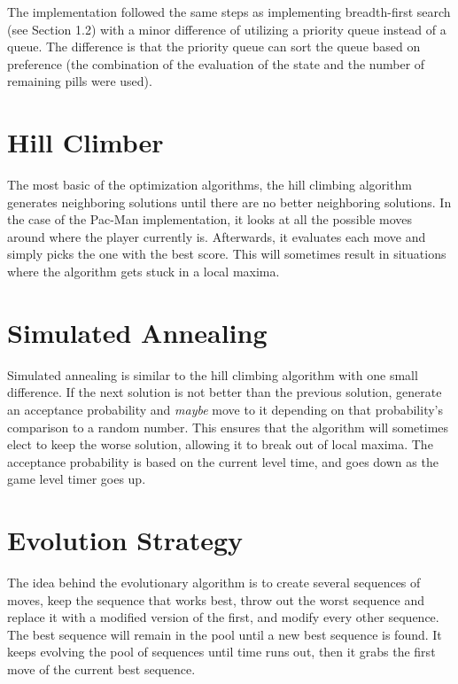 \documentclass[a4paper,oneside,10pt]{report}
\begin{document}
The implementation followed the same steps as implementing breadth-first search (see Section 1.2) with a minor difference of utilizing a priority queue instead of a queue. The difference is that the priority queue can sort the queue based on preference (the combination of the evaluation of the state and the number of remaining pills were used). 

\section{Hill Climber}\label{hill}

The most basic of the optimization algorithms, the hill climbing algorithm generates neighboring solutions until there are no better neighboring solutions. In the case of the Pac-Man implementation, it looks at all the possible moves around where the player currently is. Afterwards, it evaluates each move and simply picks the one with the best score. This will sometimes result in situations where the algorithm gets stuck in a local maxima.

\section{Simulated Annealing}\label{sannealing}

Simulated annealing is similar to the hill climbing algorithm with one small difference. If the next solution is not better than the previous solution, generate an acceptance probability and \textit{maybe} move to it depending on that probability's comparison to a random number. This ensures that the algorithm will sometimes elect to keep the worse solution, allowing it to break out of local maxima. The acceptance probability is based on the current level time, and goes down as the game level timer goes up. 

\section{Evolution Strategy}\label{evolution}

The idea behind the evolutionary algorithm is to create several sequences of moves, keep the sequence that works best, throw out the worst sequence and replace it with a modified version of the first, and modify every other sequence. The best sequence will remain in the pool until a new best sequence is found. It keeps evolving the pool of sequences until time runs out, then it grabs the first move of the current best sequence.
\end{document}
